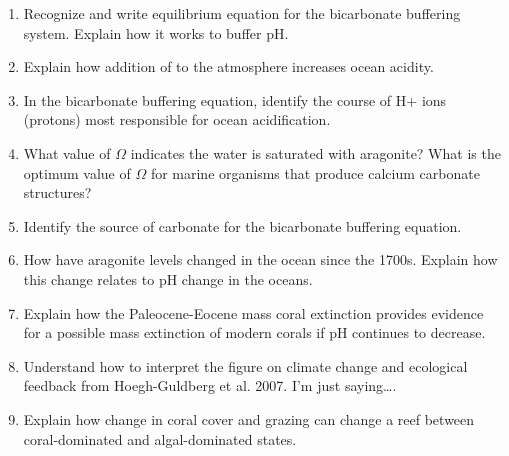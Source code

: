 \documentclass[nofonts, letterpaper]{tufte-handout}
\begin{document}
\begin{enumerate}
\item Recognize and write equilibrium equation for the bicarbonate buffering system. Explain how it works to buffer pH.

\item Explain how addition of  to the atmosphere increases ocean acidity.

\item In the bicarbonate buffering equation, identify the course of {H+} ions (protons) most responsible for ocean acidification.
 
\item What value of $\Omega$ indicates the water is saturated with aragonite? What is the optimum value of $\Omega$ for marine organisms that produce calcium carbonate structures?

\item Identify the source of carbonate for the bicarbonate buffering equation.

\item How have aragonite levels changed in the ocean since the 1700s. Explain how this change relates to pH change in the oceans.

\item Explain how the Paleocene-Eocene mass coral extinction provides evidence for a possible mass extinction of modern corals if pH continues to decrease.

\item Understand how to interpret the figure on climate change and ecological feedback from Hoegh-Guldberg et al. 2007.  I’m just saying\dots.

\item Explain how change in coral cover and grazing can change a reef between coral-dominated and algal-dominated states.


\end{enumerate}
\end{document}
